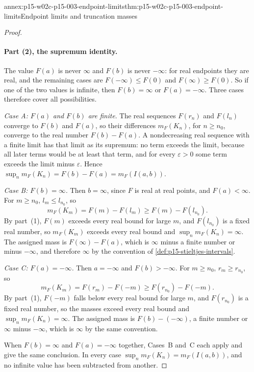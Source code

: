 \begin{annexitem}{annex:p15-w02c-p15-003-endpoint-limits}{thm:p15-w02c-p15-003-endpoint-limits}{Endpoint limits and truncation masses}
\begin{proof}
\paragraph{Part (2), the supremum identity.}
The value \(F(a)\) is never \(\infty\) and \(F(b)\) is never
\(-\infty\): for real endpoints they are real, and the remaining cases
are \(F(-\infty)\leq F(0)\) and \(F(\infty)\geq F(0)\). So if one of
the two values is infinite, then \(F(b)=\infty\) or
\(F(a)=-\infty\). Three cases therefore cover all possibilities.

\emph{Case A: \(F(a)\) and \(F(b)\) are finite.} The real sequences
\(F(r_n)\) and \(F(l_n)\) converge to \(F(b)\) and \(F(a)\), so their
differences \(m_F(K_n)\), for \(n\geq n_0\), converge to the real
number \(F(b)-F(a)\). A nondecreasing real sequence with a finite limit
has that limit as its supremum: no term exceeds the limit, because all
later terms would be at least that term, and for every
\(\varepsilon>0\) some term exceeds the limit minus \(\varepsilon\).
Hence \(\sup_nm_F(K_n)=F(b)-F(a)=m_F(I(a,b))\).

\emph{Case B: \(F(b)=\infty\).} Then \(b=\infty\), since \(F\) is
real at real points, and \(F(a)<\infty\). For \(m\geq n_0\),
\(l_m\leq l_{n_0}\), so
\[
 m_F(K_m)=F(m)-F(l_m)\geq F(m)-F(l_{n_0}).
\]
By part~(1), \(F(m)\) exceeds every real bound for large \(m\), and
\(F(l_{n_0})\) is a fixed real number, so \(m_F(K_m)\) exceeds every real
bound and \(\sup_nm_F(K_n)=\infty\). The assigned mass is
\(F(\infty)-F(a)\), which is \(\infty\) minus a finite number or minus
\(-\infty\), and therefore \(\infty\) by the convention of
\cref{def:p15-stieltjes-intervals}.

\emph{Case C: \(F(a)=-\infty\).} Then \(a=-\infty\) and
\(F(b)>-\infty\). For \(m\geq n_0\), \(r_m\geq r_{n_0}\), so
\[
 m_F(K_m)=F(r_m)-F(-m)\geq F(r_{n_0})-F(-m).
\]
By part~(1), \(F(-m)\) falls below every real bound for large \(m\),
and \(F(r_{n_0})\) is a fixed real number, so the masses exceed every
real bound and \(\sup_nm_F(K_n)=\infty\). The assigned mass is
\(F(b)-(-\infty)\), a finite number or \(\infty\) minus \(-\infty\),
which is \(\infty\) by the same convention.

When \(F(b)=\infty\) and \(F(a)=-\infty\) together, Cases~B and~C each
apply and give the same conclusion. In every case
\(\sup_nm_F(K_n)=m_F(I(a,b))\), and no infinite value has been
subtracted from another.
\end{proof}
\end{annexitem}


